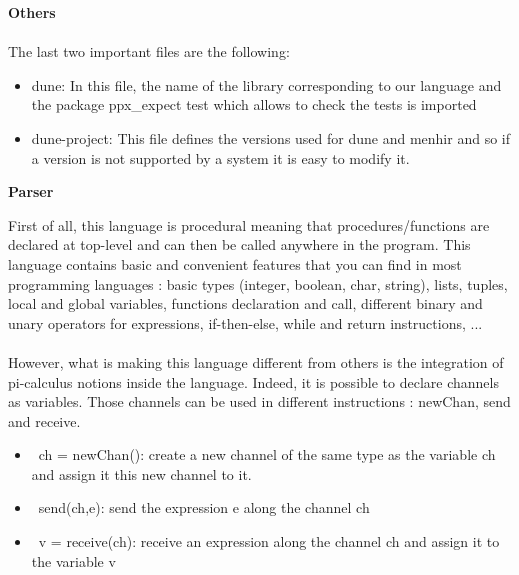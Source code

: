 \documentclass[11pt]{report}
\begin{document}
{}
\tabto{0cm} {\LARGE \textbf{Others}}
\\ \\
The last two important files are the following:

\begin{itemize}
\item dune: In this file, the name of the library corresponding to our language and the package ppx\_expect test which allows to check the tests is imported
\item dune-project: This file defines the versions used for dune and menhir and so if a version is not supported by a system it is easy to modify it.
\end{itemize}


\newpage
{}
{}
\centerline{\textbf{\Huge Parser}}
\vspace*{15pt}
{}
\vspace*{3pt}
\vspace*{20pt}
\tabto{1cm}First of all, this language is procedural meaning that procedures/functions are declared at top-level and can then be called anywhere in the program. This language contains basic and convenient features that you can find in most programming languages : basic types (integer, boolean, char, string), lists, 
tuples, local and global variables, functions declaration and call, different binary and unary operators for expressions, if-then-else, while and return instructions, ...
\\ \\
\tabto{1cm}However, what is making this language different from others is the integration of pi-calculus notions inside the language. Indeed, it is possible to declare channels as variables. Those channels can be used in different instructions : newChan, send and receive.
\begin{itemize}
\item \ ch = newChan(): create a new channel of the same type as the variable ch and assign it this new channel to it.
\item \ send(ch,e): send the expression e along the channel ch
\item \ v = receive(ch): receive an expression along the channel ch and assign it to the variable v
\end{itemize}
\end{document}
